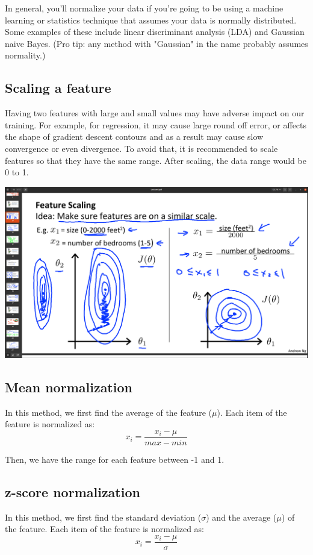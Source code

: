 \documentclass[12pt]{report}
\begin{document}
In general, you'll normalize your data if you're going to be using a machine learning or statistics technique that assumes your data is normally distributed. Some examples of these include linear discriminant analysis (LDA) and Gaussian naive Bayes. (Pro tip: any method with "Gaussian" in the name probably assumes normality.)


\subsection{Scaling a feature}
Having two features with large and small values may have adverse impact on our training. For example, for regression, it may cause large round off error, or affects the shape of gradient descent contours and as a result may cause slow convergence or even divergence. To avoid that, it is recommended to scale features so that they have the same range. After scaling, the data range would be 0 to 1.

\includegraphics[scale=0.12]{pics/scalingforGD.png}

\subsection{Mean normalization}
In this method, we first find the average of the feature ($\mu$). Each item of the feature is normalized as:
\begin{equation}
  x_i = \frac{x_i-\mu}{max-min}
\end{equation}

Then, we have the range for each feature between -1 and 1.

\subsection{z-score normalization}
In this method, we first find the standard deviation ($\sigma$) and the average ($\mu$) of the feature. Each item of the feature is normalized as:
\begin{equation}
  x_i = \frac{x_i-\mu}{\sigma}
\end{equation}
\end{document}
